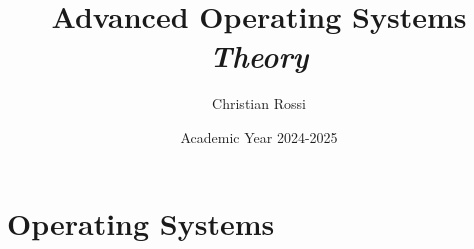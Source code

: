 \documentclass[12pt, a4paper]{report}
\title{\textbf{Advanced Operating Systems} \\ \textit{Theory}}
\author{Christian Rossi}
\date{Academic Year 2024-2025}
\begin{document}
    \maketitle

    

    \cleardoublepage

    \tableofcontents

    \cleardoublepage

    \chapter{Operating Systems}
    
    
    
    
\end{document}
